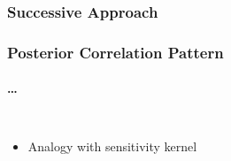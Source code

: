 \documentclass[aspectratio=169, t, 10pt, ignorenonframetext]{beamer}
\begin{document}
\begin{frame}
    \frametitle{Successive Approach}
    \begin{center}
    \end{center}
\end{frame}


\begin{frame}
    \frametitle{Posterior Correlation Pattern}
    \framesubtitle{\dots }

\begin{columns}
%
    \begin{itemize}
        \item Analogy with sensitivity kernel
    \end{itemize}

    \vspace{-10mm}

\end{columns}

\end{frame}
\end{document}

